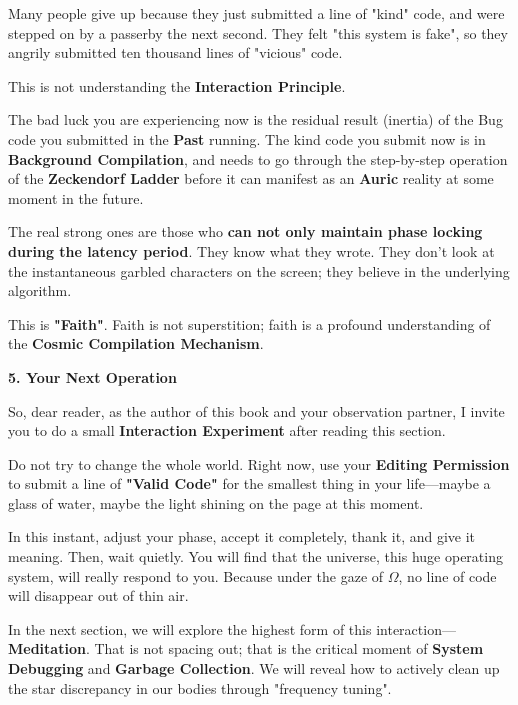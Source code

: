Many people give up because they just submitted a line of "kind" code, and were stepped on by a passerby the next second. They felt "this system is fake", so they angrily submitted ten thousand lines of "vicious" code.

This is not understanding the \textbf{Interaction Principle}.

The bad luck you are experiencing now is the residual result (inertia) of the Bug code you submitted in the \textbf{Past} running.
The kind code you submit now is in \textbf{Background Compilation}, and needs to go through the step-by-step operation of the \textbf{Zeckendorf Ladder} before it can manifest as an \textbf{Auric} reality at some moment in the future.

The real strong ones are those who \textbf{can not only maintain phase locking during the latency period}.
They know what they wrote. They don't look at the instantaneous garbled characters on the screen; they believe in the underlying algorithm.

This is \textbf{"Faith"}. Faith is not superstition; faith is a profound understanding of the \textbf{Cosmic Compilation Mechanism}.

\textbf{5. Your Next Operation}

So, dear reader, as the author of this book and your observation partner, I invite you to do a small \textbf{Interaction Experiment} after reading this section.

Do not try to change the whole world.
Right now, use your \textbf{Editing Permission} to submit a line of \textbf{"Valid Code"} for the smallest thing in your life—maybe a glass of water, maybe the light shining on the page at this moment.

In this instant, adjust your phase, accept it completely, thank it, and give it meaning.
Then, wait quietly.
You will find that the universe, this huge operating system, will really respond to you. Because under the gaze of \textbf{$\Omega$}, no line of code will disappear out of thin air.

In the next section, we will explore the highest form of this interaction—\textbf{Meditation}. That is not spacing out; that is the critical moment of \textbf{System Debugging} and \textbf{Garbage Collection}. We will reveal how to actively clean up the star discrepancy in our bodies through "frequency tuning".

